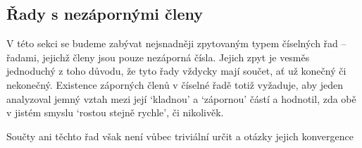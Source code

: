 \subsection{Řady s nezápornými členy}
\label{ssec:rady-s-nezapornymi-cleny}

V této sekci se budeme zabývat nejsnadněji zpytovaným typem číselných řad --
řadami, jejichž členy jsou pouze nezáporná čísla. Jejich zpyt je vesměs
jednoduchý z toho důvodu, že tyto řady vždycky mají součet, ať už konečný či
nekonečný. Existence záporných členů v číselné řadě totiž vyžaduje, aby jeden
analyzoval jemný vztah mezi její `kladnou' a `zápornou' částí a hodnotil, zda
obě v jistém smyslu `rostou stejně rychle', či nikolivěk.

Součty ani těchto řad však není vůbec triviální určit a otázky jejich
konvergence
